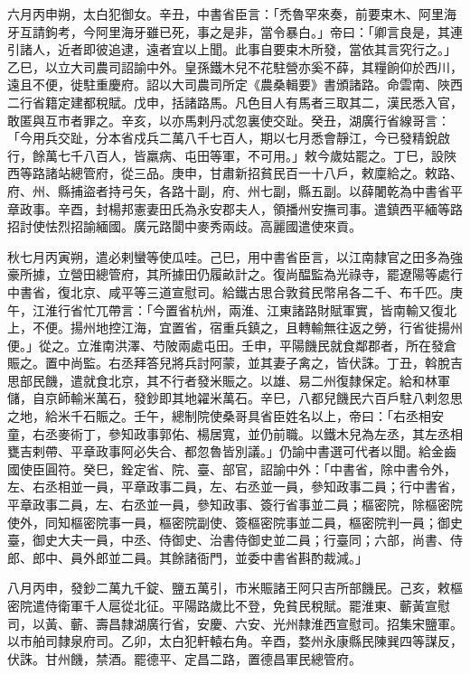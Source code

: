 \begin{pinyinscope}
 六月丙申朔，太白犯御女。辛丑，中書省臣言：「禿魯罕來奏，前要束木、阿里海牙互請鉤考，今阿里海牙雖已死，事之是非，當令暴白。」帝曰：「卿言良是，其連引諸人，近者即彼追逮，遠者宜以上聞。此事自要束木所發，當依其言究行之。」乙巳，以立大司農司詔諭中外。皇孫鐵木兒不花駐營亦奚不薛，其糧餉仰於西川，遠且不便，徙駐重慶府。詔以大司農司所定《農桑輯要》書頒諸路。命雲南、陜西二行省籍定建都稅賦。戊申，括諸路馬。凡色目人有馬者三取其二，漢民悉入官，敢匿與互市者罪之。辛亥，以亦馬剌丹忒忽裏使交趾。癸丑，湖廣行省線哥言：「今用兵交趾，分本省戍兵二萬八千七百人，期以七月悉會靜江，今已發精銳啟行，餘萬七千八百人，皆羸病、屯田等軍，不可用。」敕今歲姑罷之。丁巳，設陜西等路諸站總管府，從三品。庚申，甘肅新招貧民百一十八戶，敕廩給之。敕路、府、州、縣捕盜者持弓矢，各路十副，府、州七副，縣五副。以薛闍乾為中書省平章政事。辛酉，封楊邦憲妻田氏為永安郡夫人，領播州安撫司事。遣鎮西平緬等路招討使怯烈招諭緬國。廣元路閬中麥秀兩歧。高麗國遣使來貢。



 秋七月丙寅朔，遣必剌蠻等使瓜哇。己巳，用中書省臣言，以江南隸官之田多為強豪所據，立營田總管府，其所據田仍履畝計之。復尚醖監為光祿寺，罷遼陽等處行中書省，復北京、咸平等三道宣慰司。給鐵古思合敦貧民幣帛各二千、布千匹。庚午，江淮行省忙兀帶言：「今置省杭州，兩淮、江東諸路財賦軍實，皆南輸又復北上，不便。揚州地控江海，宜置省，宿重兵鎮之，且轉輸無往返之勞，行省徙揚州便。」從之。立淮南洪澤、芍陂兩處屯田。壬申，平陽饑民就食鄰郡者，所在發倉賑之。置中尚監。右丞拜答兒將兵討阿蒙，並其妻子禽之，皆伏誅。丁丑，斡脫吉思部民饑，遣就食北京，其不行者發米賑之。以雄、易二州復隸保定。給和林軍儲，自京師輸米萬石，發鈔即其地糴米萬石。辛巳，八都兒饑民六百戶駐八剌忽思之地，給米千石賑之。壬午，總制院使桑哥具省臣姓名以上，帝曰：「右丞相安童，右丞麥術丁，參知政事郭佑、楊居寬，並仍前職。以鐵木兒為左丞，其左丞相甕吉剌帶、平章政事阿必失合、都忽魯皆別議。」仍諭中書選可代者以聞。給金齒國使臣圓符。癸巳，銓定省、院、臺、部官，詔諭中外：「中書省，除中書令外，左、右丞相並一員，平章政事二員，左、右丞並一員，參知政事二員；行中書省，平章政事二員，左、右丞並一員，參知政事、簽行省事並二員；樞密院，除樞密院使外，同知樞密院事一員，樞密院副使、簽樞密院事並二員，樞密院判一員；御史臺，御史大夫一員，中丞、侍御史、治書侍御史並二員；行臺同；六部，尚書、侍郎、郎中、員外郎並二員。其餘諸衙門，並委中書省斟酌裁減。」



 八月丙申，發鈔二萬九千錠、鹽五萬引，市米賑諸王阿只吉所部饑民。己亥，敕樞密院遣侍衛軍千人扈從北征。平陽路歲比不登，免貧民稅賦。罷淮東、蘄黃宣慰司，以黃、蘄、壽昌隸湖廣行省，安慶、六安、光州隸淮西宣慰司。招集宋鹽軍。以市舶司隸泉府司。乙卯，太白犯軒轅右角。辛酉，婺州永康縣民陳巽四等謀反，伏誅。甘州饑，禁酒。罷德平、定昌二路，置德昌軍民總管府。




\end{pinyinscope}
